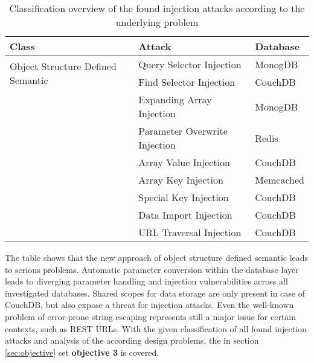 \begin{table}[h]
  \sffamily
  \centering 
  \begin{tabular}{lll}
  \textbf{Class} & \textbf{Attack} & \textbf{Database} \\ \hline
  \multirow{2}{*}{Object Structure Defined Semantic}
    & Query Selector Injection & MonogDB \\
    & Find Selector Injection & CouchDB \\ \hdashline
  \multirow{4}{*}{Diverging Parameter Handling}
    & Expanding Array Injection & MonogDB \\
    & Parameter Overwrite Injection & Redis \\
    & Array Value Injection & CouchDB \\
    & Array Key Injection & Memcached \\ \hdashline
  \multirow{2}{*}{Shared Scope for Data}
    & Special Key Injection & CouchDB \\
    & Data Import Injection & CouchDB \\ \hdashline
  \multirow{1}{*}{Error-prone String Escaping}
    & URL Traversal Injection & CouchDB \\ \hline
  \end{tabular}
  \caption{Classification overview of the found injection attacks according to the underlying problem}
  \label{tab:attack_classification_overview}
\end{table}

The table shows that the new approach of object structure defined semantic leads to serious problems. Automatic parameter conversion within the database layer leads to diverging parameter handling and injection vulnerabilities across all investigated databases. Shared scopes for data storage are only present in case of CouchDB, but also expose a threat for injection attacks. Even the well-known problem of error-prone string escaping represents still a major issue for certain contexts, such as REST URLs. With the given classification of all found injection attacks and analysis of the according design problems, the in section \ref{sec:objective} set \textbf{objective 3} is covered.